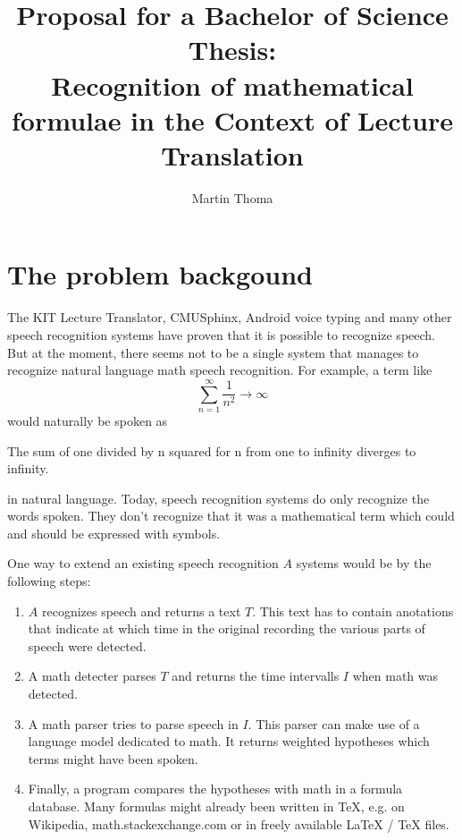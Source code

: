 \documentclass[a4paper]{scrartcl}
\begin{document}
    \title{Proposal for a Bachelor of Science Thesis:\\Recognition of mathematical formulae in the Context of Lecture Translation}
    \author{Martin Thoma}
    \maketitle
\section{The problem backgound}
    The KIT Lecture Translator, CMUSphinx, Android voice typing and
    many other speech recognition systems have proven that it is possible to 
    recognize speech. But at the moment, there seems not to be a single
    system that manages to recognize natural language math speech
    recognition. For example, a term like
    \[\sum_{n=1}^\infty \frac{1}{n^2} \rightarrow \infty \]
    would naturally be spoken as

\begin{shadequote}[l]{}
The sum of one divided by n squared for n from one to infinity diverges to infinity.
\end{shadequote}

    in natural language. Today, speech recognition systems do only
    recognize the words spoken. They don't recognize that it was a
    mathematical term which could and should be expressed with symbols.

    One way to extend an existing speech recognition $A$ systems would be
    by the following steps:
    \begin{enumerate}
        \item $A$ recognizes speech and returns a text $T$. This text
              has to contain anotations that indicate at which time
              in the original recording the various parts of speech
              were detected.
        \item A math detecter parses $T$ and returns the time intervalls $I$
              when math was detected.
        \item A math parser tries to parse speech in $I$. This parser
              can make use of a language model dedicated to math. It
              returns weighted hypotheses which terms might have
              been spoken.
        \item Finally, a program compares the hypotheses with math
              in a formula database. Many formulas might already been
              written in \TeX{}, e.g. on Wikipedia, math.stackexchange.com
              or in freely available \LaTeX{} / \TeX{} files.
    \end{enumerate}
\break
\end{document}
